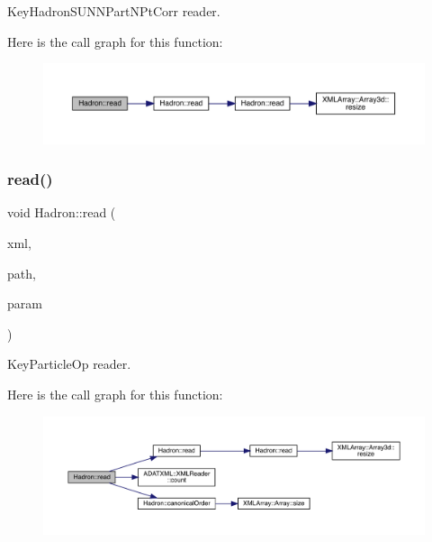 Key\+Hadron\+S\+U\+N\+N\+Part\+N\+Pt\+Corr reader. 

Here is the call graph for this function\+:
\nopagebreak
\begin{figure}[H]
\begin{center}
\leavevmode
\includegraphics[width=350pt]{d1/daf/namespaceHadron_a921e2dea91400934dabd596c18164033_cgraph}
\end{center}
\end{figure}
\mbox{\label{namespaceHadron_aa490647cc42691054f51d9885e6ec91c}} 
\subsubsection{\texorpdfstring{read()}{read()}\hspace{0.1cm}{\footnotesize\ttfamily [17/94]}}
{\footnotesize\ttfamily void Hadron\+::read (\begin{DoxyParamCaption}\item[{\mbox{\hyperlink{classADATXML_1_1XMLReader}{X\+M\+L\+Reader}} \&}]{xml,  }\item[{const std\+::string \&}]{path,  }\item[{\mbox{\hyperlink{structHadron_1_1KeyParticleOp__t}{Key\+Particle\+Op\+\_\+t}} \&}]{param }\end{DoxyParamCaption})}



Key\+Particle\+Op reader. 

Here is the call graph for this function\+:
\nopagebreak
\begin{figure}[H]
\begin{center}
\leavevmode
\includegraphics[width=350pt]{d1/daf/namespaceHadron_aa490647cc42691054f51d9885e6ec91c_cgraph}
\end{center}
\end{figure}
\mbox{\label{namespaceHadron_ad46ef728c9d609cbf63217c66bdf0285}} 
